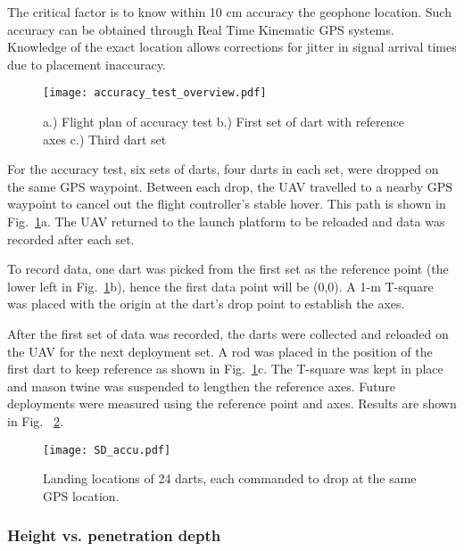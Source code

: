 The critical factor is to know within 10 cm accuracy the geophone location.  Such accuracy can be obtained through Real Time Kinematic GPS systems. Knowledge of the exact location allows corrections for jitter in signal arrival times due to  placement inaccuracy.


\begin{figure} \centering
  {\texttt{[image: accuracy\_test\_overview.pdf]}}
 \caption{a.) Flight plan of accuracy test b.) First set of dart with reference axes c.) Third dart set } 
 \label{fig:Accu_test_darts}
\end{figure}

For the accuracy test, six sets of darts, four darts in each set, were dropped on the same GPS waypoint. Between each drop, the UAV travelled to a nearby GPS waypoint to cancel out the flight controller's stable hover.  This path is shown in Fig.~\ref{fig:Accu_test_darts}a. The UAV returned to the launch platform to be reloaded and data was recorded after each set.

To record data, one dart was picked from the first set as the reference point (the lower left in Fig.~\ref{fig:Accu_test_darts}b), hence the first data point will be (0,0). A 1-m T-square was placed with the origin at the dart's drop point to establish the axes.

After the first set of data was recorded, the darts were collected and reloaded on the UAV for the next deployment set.
 A rod was placed in the position of the first dart to keep reference as shown in Fig.~\ref{fig:Accu_test_darts}c. 
 The T-square was kept in place and mason twine was suspended to lengthen the reference axes. 
 Future deployments were measured  using the reference point and axes. Results are shown in Fig.~ \ref{fig:SD_accu.pdf}.


\begin{figure} \centering
  {\texttt{[image: SD\_accu.pdf]}}
 \caption{Landing locations of 24 darts, each commanded to drop at the same GPS location. 
 \label{fig:SD_accu.pdf}}
\end{figure}


\subsubsection{Height vs. penetration depth}

